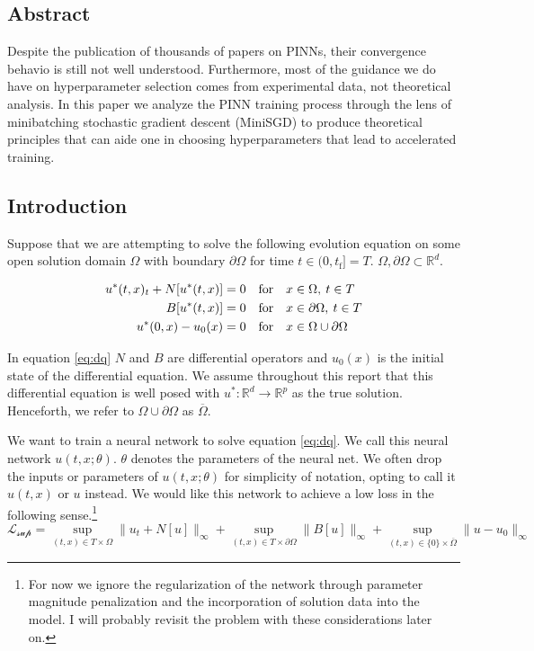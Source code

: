\documentclass[12pt]{article}
\begin{document}
\subsection{Abstract}

Despite the publication of thousands of papers on PINNs, their convergence behavio is still not well understood. Furthermore, most of the guidance we do have on hyperparameter selection comes from experimental data, not theoretical analysis. In this paper we analyze the PINN training process through the lens of minibatching stochastic gradient descent (MiniSGD) to produce theoretical principles that can aide one in choosing hyperparameters that lead to accelerated training.

\subsection{Introduction}

Suppose that we are attempting to solve the following evolution equation on some open solution domain $\Omega$ with boundary $\partial \Omega$ for time $t \in (0,t_{\text{f}}] = T$. $\Omega, \partial \Omega \subset \mathbb{R}^d$.

\begin{align} \label{eq:dq}
	u^*(t,x)_t + N[u^*(t,x)] = 0& \quad \text{for} \quad x \in \Omega, \: t \in T \notag\\
	B[u^*(t,x)] = 0& \quad \text{for} \quad x \in \partial \Omega , \: t \in T\\
	u^*(0,x) - u_0(x) = 0& \quad \text{for} \quad x \in \Omega \cup \partial \Omega \notag
\end{align} 

\noindent In equation \ref{eq:dq} $N$ and $B$ are differential operators and $u_0(x)$ is the initial state of the differential equation. We assume throughout this report that this differential equation is well posed with $u^*: \mathbb{R}^d \to \mathbb{R}^p$ as the true solution. Henceforth, we refer to $\Omega \cup \partial \Omega$ as $\overline{\Omega}$.

We want to train a neural network to solve equation \ref{eq:dq}. We call this neural network $u(t,x;\theta)$. $\theta$ denotes the parameters of the neural net. We often drop the inputs or parameters of $u(t,x;\theta)$ for simplicity of notation, opting to call it $u(t,x)$ or $u$ instead. We would like this network to achieve a low loss in the following sense.\footnote{For now we ignore the regularization of the network through parameter magnitude penalization and the incorporation of solution data into the model. I will probably revisit the problem with these considerations later on.}
\begin{equation}
\mathcal{L_{\text{sup}}} = \sup_{(t,x) \in T \times\Omega} \| u_t + N[u] \|_{\infty} + \sup_{(t,x) \in T \times \partial \Omega} \| B[u] \|_{\infty} + \sup_{(t,x) \in \{0\} \times \overline{\Omega}} \| u - u_0 \|_{\infty}
\end{equation}
\end{document}
